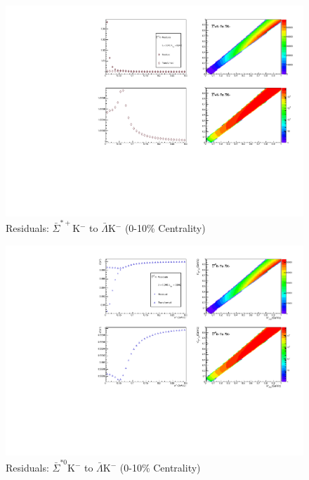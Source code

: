 \documentclass[../AnalysisNoteJBuxton.tex]{subfiles}
\begin{document}
\begin{figure}[h]
  \centering
  \includegraphics[width=\textwidth]{9_AdditionalFigures/Figures/Residuals/ALamKchM/Residuals_ALamKchM_0010_ASigStPKchM_MomResCrctn_NonFlatBgdCrctn_ResidualsIncluded_UsingCoulombOnlyInterpCfs.pdf}
  \caption[Residuals: $\bar{\Sigma}^{*+}$K$^{-}$ to $\bar{\Lambda}$K$^{-}$ (0-10\% Centrality)]{Residuals: $\bar{\Sigma}^{*+}$K$^{-}$ to $\bar{\Lambda}$K$^{-}$ (0-10\% Centrality)}
  \label{fig:Res_ALamKchM_0010_ASigStPKchM}
\end{figure}

\begin{figure}[h]
  \centering
  \includegraphics[width=\textwidth]{9_AdditionalFigures/Figures/Residuals/ALamKchM/Residuals_ALamKchM_0010_ASigSt0KchM_MomResCrctn_NonFlatBgdCrctn_ResidualsIncluded_UsingCoulombOnlyInterpCfs.pdf}
  \caption[Residuals: $\bar{\Sigma}^{*0}$K$^{-}$ to $\bar{\Lambda}$K$^{-}$ (0-10\% Centrality)]{Residuals: $\bar{\Sigma}^{*0}$K$^{-}$ to $\bar{\Lambda}$K$^{-}$ (0-10\% Centrality)}
  \label{fig:Res_ALamKchM_0010_ASigSt0KchM}
\end{figure}
\end{document}
